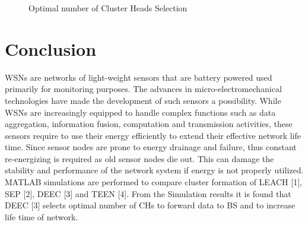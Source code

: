 \documentclass[10pt, conference, compsocconf]{IEEEtran}
\begin{document}
\begin{figure}[!ht]
\begin{flushright}
  \caption{Optimal number of Cluster Heads Selection}\label{Fig. 4}
   \end{flushright}
\end{figure}


\section{Conclusion}
WSNs are networks of light-weight sensors that are battery powered used primarily for monitoring purposes. The advances in micro-electromechanical technologies have made the development of such sensors a possibility. While WSNs are increasingly equipped to handle complex functions such as data aggregation, information fusion, computation and transmission activities, these sensors require to use their energy efficiently to extend their effective network life time. Since sensor nodes are prone to energy drainage and failure, thus constant re-energizing is required as old sensor nodes die out. This can damage  the stability and performance of the network system if energy is not properly utilized. MATLAB simulations are performed to compare cluster formation of LEACH [1], SEP [2], DEEC [3] and TEEN [4]. From the Simulation results it is found that DEEC [3] selects optimal number of CHs to forward data to BS and to increase life time of network.
\end{document}
